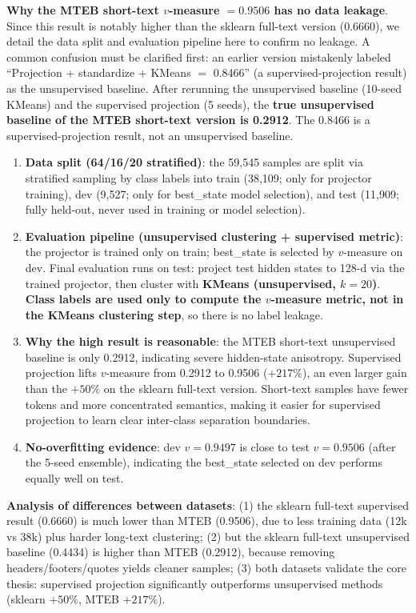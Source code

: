 \documentclass[11pt]{article}
\begin{document}
\textbf{Why the MTEB short-text $v$-measure $=0.9506$ has no data leakage}.
Since this result is notably higher than the sklearn full-text version
(0.6660), we detail the data split and evaluation pipeline here to confirm
no leakage. A common confusion must be clarified first: an earlier version
mistakenly labeled ``Projection + standardize + KMeans $=$ 0.8466'' (a
supervised-projection result) as the unsupervised baseline. After rerunning
the unsupervised baseline (10-seed KMeans) and the supervised projection
(5 seeds), the \textbf{true unsupervised baseline of the MTEB short-text
version is 0.2912}. The 0.8466 is a supervised-projection result, not an
unsupervised baseline.

\begin{enumerate}
  \item \textbf{Data split (64/16/20 stratified)}: the 59,545 samples are
  split via stratified sampling by class labels into train (38,109; only for
  projector training), dev (9,527; only for best\_state model selection),
  and test (11,909; fully held-out, never used in training or model
  selection).
  \item \textbf{Evaluation pipeline (unsupervised clustering + supervised
  metric)}: the projector is trained only on train; best\_state is selected
  by $v$-measure on dev. Final evaluation runs on test: project test hidden
  states to 128-d via the trained projector, then cluster with
  \textbf{KMeans (unsupervised, $k{=}20$)}. \textbf{Class labels are used
  only to compute the $v$-measure metric, not in the KMeans clustering
  step}, so there is no label leakage.
  \item \textbf{Why the high result is reasonable}: the MTEB short-text
  unsupervised baseline is only 0.2912, indicating severe hidden-state
  anisotropy. Supervised projection lifts $v$-measure from 0.2912 to 0.9506
  ($+217\%$), an even larger gain than the $+50\%$ on the sklearn full-text
  version. Short-text samples have fewer tokens and more concentrated
  semantics, making it easier for supervised projection to learn clear
  inter-class separation boundaries.
  \item \textbf{No-overfitting evidence}: dev $v=0.9497$ is close to test
  $v=0.9506$ (after the 5-seed ensemble), indicating the best\_state
  selected on dev performs equally well on test.
\end{enumerate}

\textbf{Analysis of differences between datasets}: (1) the sklearn
full-text supervised result (0.6660) is much lower than MTEB (0.9506), due
to less training data (12k vs 38k) plus harder long-text clustering; (2) but
the sklearn full-text unsupervised baseline (0.4434) is higher than MTEB
(0.2912), because removing headers/footers/quotes yields cleaner samples;
(3) both datasets validate the core thesis: supervised projection
significantly outperforms unsupervised methods (sklearn $+50\%$, MTEB
$+217\%$).
\end{document}
